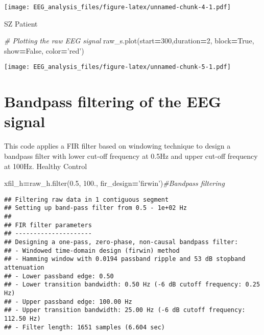 \documentclass[]{book}
\newenvironment{Shaded}{\begin{snugshade}}{\end{snugshade}}
\newcommand{\BuiltInTok}[1]{#1}
\newcommand{\CommentTok}[1]{\textcolor[rgb]{0.56,0.35,0.01}{\textit{#1}}}
\newcommand{\DecValTok}[1]{\textcolor[rgb]{0.00,0.00,0.81}{#1}}
\newcommand{\FloatTok}[1]{\textcolor[rgb]{0.00,0.00,0.81}{#1}}
\newcommand{\NormalTok}[1]{#1}
\newcommand{\OperatorTok}[1]{\textcolor[rgb]{0.81,0.36,0.00}{\textbf{#1}}}
\newcommand{\StringTok}[1]{\textcolor[rgb]{0.31,0.60,0.02}{#1}}
\newcommand{\VariableTok}[1]{\textcolor[rgb]{0.00,0.00,0.00}{#1}}
\begin{document}
\texttt{[image: EEG\_analysis\_files/figure-latex/unnamed-chunk-4-1.pdf]}

SZ Patient

\begin{Shaded}
\begin{Highlighting}[]
\CommentTok{# Plotting the raw EEG signal}
\NormalTok{raw_s.plot(start}\OperatorTok{=}\DecValTok{300}\NormalTok{,duration}\OperatorTok{=}\DecValTok{2}\NormalTok{, block}\OperatorTok{=}\VariableTok{True}\NormalTok{, show}\OperatorTok{=}\VariableTok{False}\NormalTok{, color}\OperatorTok{=}\StringTok{'red'}\NormalTok{)}
\end{Highlighting}
\end{Shaded}

\texttt{[image: EEG\_analysis\_files/figure-latex/unnamed-chunk-5-1.pdf]}

\hypertarget{bandpass-filtering-of-the-eeg-signal}{%
\section{Bandpass filtering of the EEG signal}\label{bandpass-filtering-of-the-eeg-signal}}

This code applies a FIR filter based on windowing technique to design a bandpass filter with lower cut-off frequency at 0.5Hz and upper cut-off frequency at 100Hz.
Healthy Control

\begin{Shaded}
\begin{Highlighting}[]
\NormalTok{xfil_h}\OperatorTok{=}\NormalTok{raw_h.}\BuiltInTok{filter}\NormalTok{(}\FloatTok{0.5}\NormalTok{, }\FloatTok{100.}\NormalTok{, fir_design}\OperatorTok{=}\StringTok{'firwin'}\NormalTok{)}\CommentTok{#Bandpass filtering}
\end{Highlighting}
\end{Shaded}

\begin{verbatim}
## Filtering raw data in 1 contiguous segment
## Setting up band-pass filter from 0.5 - 1e+02 Hz
## 
## FIR filter parameters
## ---------------------
## Designing a one-pass, zero-phase, non-causal bandpass filter:
## - Windowed time-domain design (firwin) method
## - Hamming window with 0.0194 passband ripple and 53 dB stopband attenuation
## - Lower passband edge: 0.50
## - Lower transition bandwidth: 0.50 Hz (-6 dB cutoff frequency: 0.25 Hz)
## - Upper passband edge: 100.00 Hz
## - Upper transition bandwidth: 25.00 Hz (-6 dB cutoff frequency: 112.50 Hz)
## - Filter length: 1651 samples (6.604 sec)
\end{verbatim}
\end{document}
